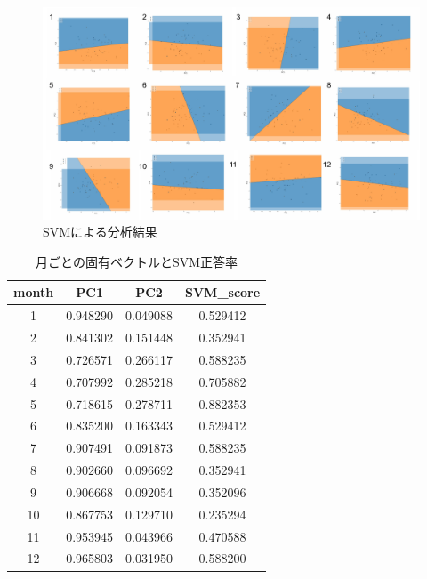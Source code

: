 \documentclass{jarticle}
\begin{document}
\begin{figure}[H]
\centering
\includegraphics[keepaspectratio, scale=0.56]
{svm_plot.pdf}
\caption{SVMによる分析結果}
\label{svm}
\end{figure}

\begin{table}[H]
\caption{月ごとの固有ベクトルとSVM正答率}
\begin{tabular}{|c|c|c|c|} \hline
month&PC1&PC2 &SVM\_score\\ \hline
 1&0.948290&0.049088&0.529412\\ \hline
 2&0.841302&0.151448&0.352941\\ \hline
 3&0.726571&0.266117&0.588235\\ \hline
 4&0.707992 &0.285218&0.705882\\ \hline
 5&0.718615&0.278711&0.882353\\ \hline
 6&0.835200&0.163343&0.529412\\ \hline
 7&0.907491&0.091873&0.588235\\ \hline
 8&0.902660&0.096692&0.352941\\ \hline
 9&0.906668&0.092054&0.352096\\ \hline
 10&0.867753&0.129710&0.235294\\ \hline
 11&0.953945&0.043966&0.470588\\ \hline
 12&0.965803&0.031950&0.588200\\ \hline
\end{tabular}
\centering
\label{score}
\end{table}
\end{document}
